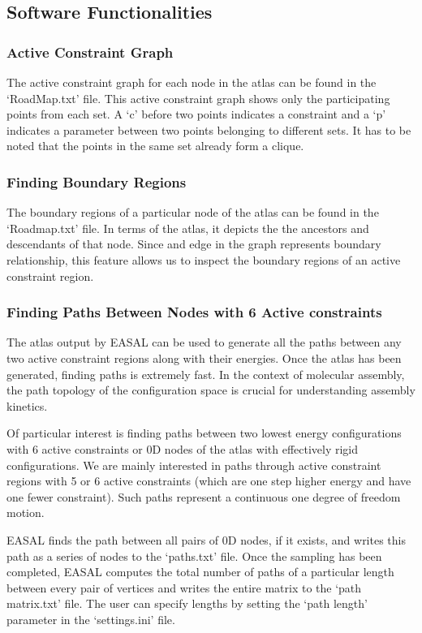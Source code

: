 \documentclass[10pt]{article}
\begin{document}
\subsection{Software Functionalities}

\subsubsection{Active Constraint Graph} 
The active constraint graph for each node in the atlas can be found in the `RoadMap.txt' file. This active
constraint graph shows only the participating points from each set. A `c' before two points indicates a
constraint and a `p' indicates a parameter between two points belonging to different sets. It has to be noted
that the points in the same set already form a clique.

\subsubsection{Finding Boundary Regions} 
The boundary regions of a particular node of the atlas can be found in the `Roadmap.txt' file. In terms of
the atlas, it depicts the the ancestors and descendants of that node. Since and edge in the graph represents
boundary relationship, this feature allows us to inspect the boundary regions of an active constraint region.


\subsubsection{Finding Paths Between Nodes with 6 Active constraints}
The atlas output by EASAL can be used to generate all the paths between any two active constraint regions
along with their energies. Once the atlas has been generated, finding paths is extremely fast. In the context
of molecular assembly, the path topology of the configuration space is crucial for understanding assembly
kinetics.

Of particular interest is finding paths between two lowest energy configurations with 6 active constraints
or 0D nodes of the atlas with effectively rigid configurations. We are mainly interested in paths through
active constraint regions with 5 or 6 active constraints (which are one step higher energy and have one fewer
constraint). Such paths represent a continuous one degree of freedom motion.

EASAL finds the path between all pairs of 0D nodes, if it exists, and writes this path as a series of nodes
to the `paths.txt' file. Once the sampling has been completed, EASAL computes the total number of paths
of a particular length between every pair of vertices and writes the entire matrix to the `path matrix.txt'
file. The user can specify lengths by setting the `path length' parameter in the `settings.ini' file.
\end{document}
